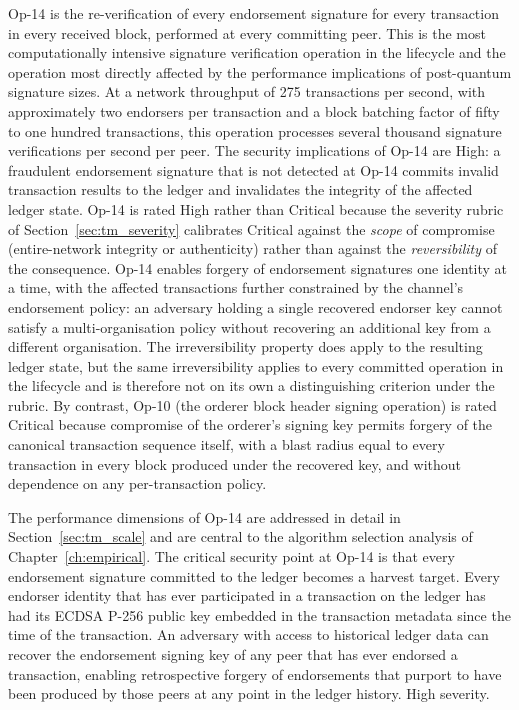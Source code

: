 \documentclass[conference]{IEEEtran}
\begin{document}
Op-14 is the re-verification of every endorsement signature for every
transaction in every received block, performed at every committing peer.
This is the most computationally intensive signature verification
operation in the lifecycle and the operation most directly affected by
the performance implications of post-quantum signature sizes. At a
network throughput of 275 transactions per second, with approximately
two endorsers per transaction and a block batching factor of fifty to
one hundred transactions, this operation processes several thousand
signature verifications per second per peer. The security implications
of Op-14 are High: a fraudulent endorsement signature that is not
detected at Op-14 commits invalid transaction results to the ledger
and invalidates the integrity of the affected ledger state. Op-14 is
rated High rather than Critical because the severity rubric of
Section~\ref{sec:tm_severity} calibrates Critical against the
\textit{scope} of compromise (entire-network integrity or
authenticity) rather than against the \textit{reversibility} of the
consequence. Op-14 enables forgery of endorsement signatures one
identity at a time, with the affected transactions further constrained
by the channel's endorsement policy: an adversary holding a single
recovered endorser key cannot satisfy a multi-organisation policy
without recovering an additional key from a different organisation.
The irreversibility property does apply to the resulting ledger
state, but the same irreversibility applies to every committed
operation in the lifecycle and is therefore not on its own a
distinguishing criterion under the rubric. By contrast, Op-10 (the
orderer block header signing operation) is rated Critical because
compromise of the orderer's signing key permits forgery of the
canonical transaction sequence itself, with a blast radius equal to
every transaction in every block produced under the recovered key, and
without dependence on any per-transaction policy.

The performance dimensions of Op-14 are addressed in detail in
Section~\ref{sec:tm_scale} and are central to the algorithm selection
analysis of Chapter~\ref{ch:empirical}. The critical security
point at Op-14 is that every endorsement signature committed to the
ledger becomes a harvest target. Every endorser identity that has ever
participated in a transaction on the ledger has had its ECDSA P-256
public key embedded in the transaction metadata since the time of the
transaction. An adversary with access to historical ledger data can
recover the endorsement signing key of any peer that has ever endorsed
a transaction, enabling retrospective forgery of endorsements that
purport to have been produced by those peers at any point in the ledger
history. High severity.
\end{document}
